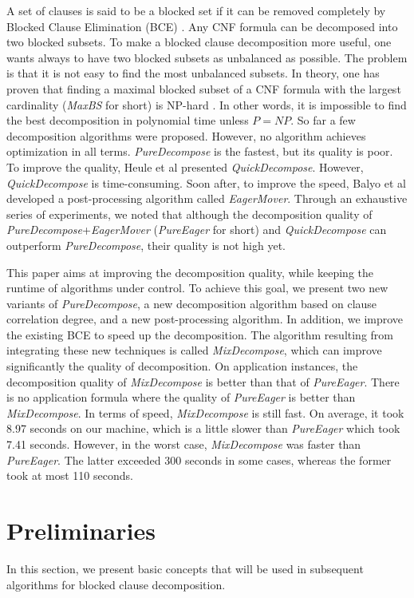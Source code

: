 \documentclass{llncs}
\begin{document}
 A set of clauses is said to be a blocked set if it can be removed
 completely by Blocked Clause Elimination (BCE) \cite{BCE:99,BCE:12}.
 Any CNF formula can be decomposed into two blocked subsets.
To make a blocked clause decomposition more useful, one wants always
to have two blocked subsets as unbalanced as possible. The problem
is that it is not easy to find the most unbalanced subsets. In
theory, one has proven that finding a maximal blocked subset of a
CNF formula with the largest cardinality (\emph{MaxBS} for short) is
NP-hard \cite{sbliter:13}. In other words, it is impossible to find
the best decomposition in polynomial time unless $P = NP$. So far a
few decomposition algorithms were proposed. However, no algorithm
achieves optimization in all terms. \emph{PureDecompose} \cite
{sbliter:13} is the fastest, but its quality is poor. To improve the
quality, Heule et al \cite{sbliter:13} presented
\emph{QuickDecompose}. However, \emph{QuickDecompose} is
time-consuming. Soon after, to improve the speed, Balyo et al
\cite{EagerMover:14} developed a post-processing algorithm called
\emph{EagerMover}. Through an exhaustive series of experiments, we
noted that although the decomposition quality of
\emph{PureDecompose}+\emph{EagerMover} (\emph{PureEager} for short)
and \emph{QuickDecompose} can outperform \emph{PureDecompose}, their
quality is not high yet.

   This paper aims at improving the decomposition quality, while
keeping the runtime of algorithms under control. To achieve this
goal, we present two new variants of \emph{PureDecompose},
 a new decomposition algorithm based
 on clause correlation degree, and a new post-processing algorithm.
 In addition, we improve the existing BCE to speed up the
 decomposition. The algorithm resulting from integrating these new techniques is called
 \emph{MixDecompose}, which can improve significantly the quality of
 decomposition. On application instances,
 the decomposition quality of \emph{MixDecompose} is better than that of \emph{PureEager}.
There is no application formula where the quality of
\emph{PureEager} is better than \emph{MixDecompose}. In terms of
speed, \emph{MixDecompose} is still fast. On average, it took 8.97
seconds on our machine, which is a little slower than
\emph{PureEager} which took 7.41 seconds. However, in the worst case,
\emph{MixDecompose} was faster than \emph{PureEager}. The latter
exceeded 300 seconds in some cases, whereas the former took at most
110 seconds.


\section{Preliminaries}
In this section, we present basic concepts that will be used in
subsequent algorithms for blocked clause decomposition.
\end{document}
